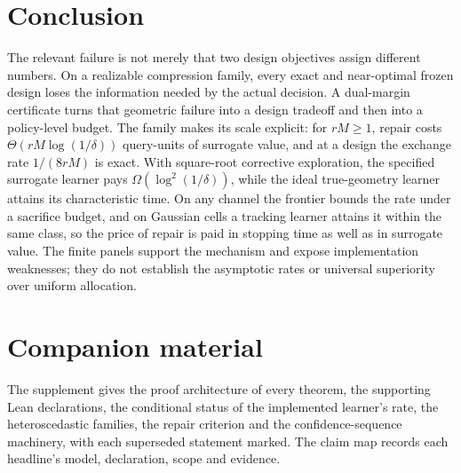 \section{Conclusion}

The relevant failure is not merely that two design objectives assign different numbers.
On a realizable compression family, every exact and near-optimal frozen design loses the
information needed by the actual decision. A dual-margin certificate turns that geometric
failure into a design tradeoff and then into a policy-level budget. The family makes its
scale explicit: for $rM\ge1$, repair costs $\Theta(rM\log(1/\delta))$ query-units of surrogate
value, and at a design the exchange rate $1/(8rM)$ is exact. With square-root corrective exploration, the specified surrogate learner pays
$\Omega(\log^2(1/\delta))$, while the ideal true-geometry learner attains its characteristic
time. On any channel the frontier bounds the rate under a sacrifice budget, and on Gaussian
cells a tracking learner attains it within the same class, so the price of repair is paid in
stopping time as well as in surrogate value. The finite panels
support the mechanism and expose implementation weaknesses; they
do not establish the asymptotic rates or universal superiority over uniform allocation.

\section*{Companion material}
The supplement gives the proof architecture of every theorem, the supporting Lean declarations,
the conditional status of the implemented learner's rate, the heteroscedastic families, the
repair criterion and the confidence-sequence machinery, with each superseded statement marked.
The claim map records each headline's model, declaration, scope and evidence.

